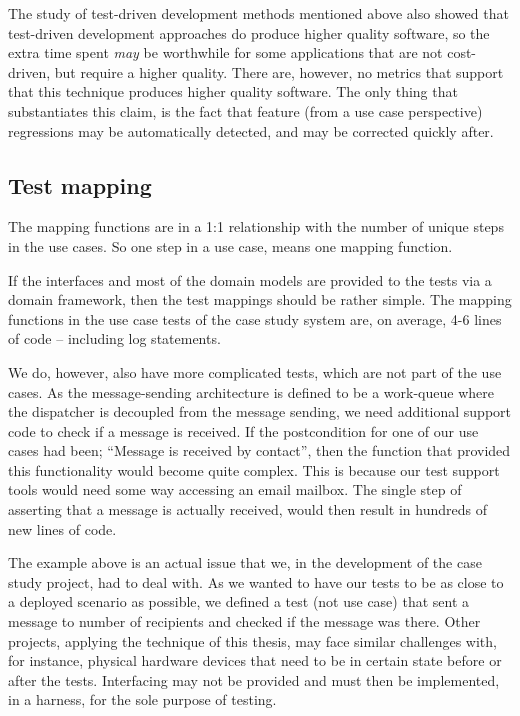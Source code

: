 \noindent The study of test-driven development methods mentioned above also showed that test-driven development approaches do produce higher quality software, so the extra time spent \emph{may} be worthwhile for some applications that are not cost-driven, but require a higher quality. There are, however, no metrics that support that this technique produces higher quality software. The only thing that substantiates this claim, is the fact that feature (from a use case perspective) regressions may be automatically detected, and may be corrected quickly after.

\subsection{Test mapping}
The mapping functions are in a 1:1 relationship with the number of unique steps in the use cases. So one step in a use case, means one mapping function.\medskip

\noindent If the interfaces and most of the domain models are provided to the tests via a domain framework, then the test mappings should be rather simple. The mapping functions in the use case tests of the case study system are, on average, 4-6 lines of code -- including log statements.\medskip

\noindent We do, however, also have more complicated tests, which are not part of the use cases. As the message-sending architecture is defined to be a work-queue where the dispatcher is decoupled from the message sending, we need additional support code to check if a message is received. If the postcondition for one of our use cases had been; ``Message is received by contact'', then the function that provided this functionality would become quite complex. This is because our test support tools would need some way accessing an email mailbox. The single step of asserting that a message is actually received, would then result in hundreds of new lines of code.\medskip

\noindent The example above is an actual issue that we, in the development of the case study project, had to deal with. As we wanted to have our tests to be as close to a deployed scenario as possible, we defined a test (not use case) that sent a message to number of recipients and checked if the message was there. Other projects, applying the technique of this thesis, may face similar challenges with, for instance, physical hardware devices that need to be in certain state before or after the tests. Interfacing may not be provided and must then be implemented, in a harness, for the sole purpose of testing.\medskip

